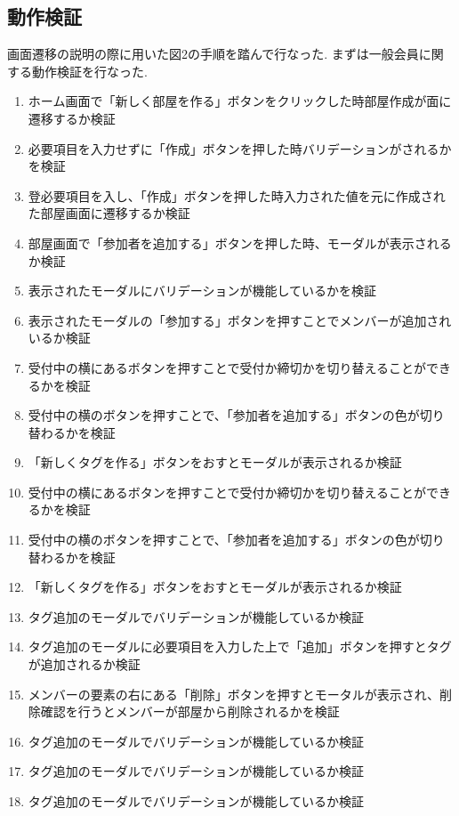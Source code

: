 \documentclass[submit,techrep]{ipsj}
\begin{document}
\subsection{動作検証}
画面遷移の説明の際に用いた図2の手順を踏んで行なった.
まずは一般会員に関する動作検証を行なった.
\begin{enumerate}
  \item ホーム画面で「新しく部屋を作る」ボタンをクリックした時部屋作成が面に遷移するか検証
  \item 必要項目を入力せずに「作成」ボタンを押した時バリデーションがされるかを検証
  \item 登必要項目を入し、「作成」ボタンを押した時入力された値を元に作成された部屋画面に遷移するか検証
  \item 部屋画面で「参加者を追加する」ボタンを押した時、モーダルが表示されるか検証
  \item 表示されたモーダルにバリデーションが機能しているかを検証
   \item 表示されたモーダルの「参加する」ボタンを押すことでメンバーが追加されいるか検証
  \item 受付中の横にあるボタンを押すことで受付か締切かを切り替えることができるかを検証
   \item 受付中の横のボタンを押すことで、「参加者を追加する」ボタンの色が切り替わるかを検証
  \item 「新しくタグを作る」ボタンをおすとモーダルが表示されるか検証
   \item 受付中の横にあるボタンを押すことで受付か締切かを切り替えることができるかを検証
   \item 受付中の横のボタンを押すことで、「参加者を追加する」ボタンの色が切り替わるかを検証
  \item 「新しくタグを作る」ボタンをおすとモーダルが表示されるか検証
   \item タグ追加のモーダルでバリデーションが機能しているか検証
   \item タグ追加のモーダルに必要項目を入力した上で「追加」ボタンを押すとタグが追加されるか検証
  \item メンバーの要素の右にある「削除」ボタンを押すとモータルが表示され、削除確認を行うとメンバーが部屋から削除されるかを検証
   \item タグ追加のモーダルでバリデーションが機能しているか検証
    \item タグ追加のモーダルでバリデーションが機能しているか検証
     \item タグ追加のモーダルでバリデーションが機能しているか検証
  \end{enumerate}
    
\end{document}
